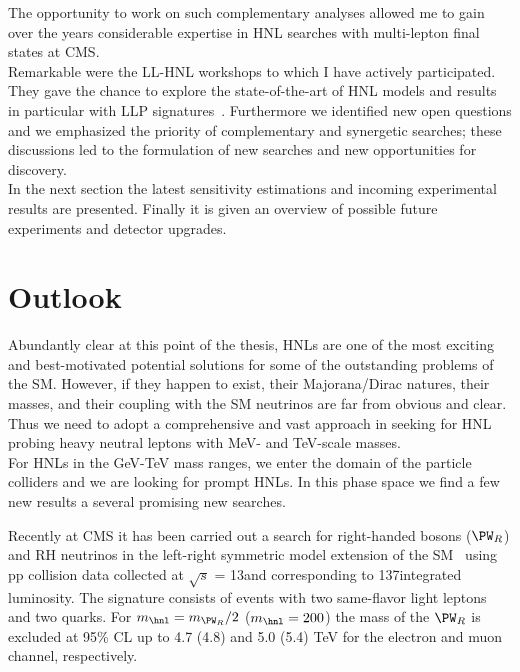 The opportunity to work on such complementary analyses
allowed me to gain over the years considerable expertise in HNL
searches with multi-lepton final states at CMS.\\
Remarkable were the LL-HNL workshops to which I have actively
participated. They gave the chance to explore the 
state-of-the-art of HNL models and results in particular with LLP
signatures~\cite{Alimena_2020}. Furthermore we identified new open questions and
we emphasized the priority 
of complementary and synergetic searches; these discussions
led to the formulation of new searches and new opportunities
for discovery.\\

In the next section the latest sensitivity
estimations and incoming experimental results are presented. Finally
it is given 
an overview of possible future experiments
and detector upgrades. 


\section{Outlook}
Abundantly clear at this point of the thesis, HNLs are one of the most
exciting and best-motivated potential solutions for some of the
outstanding problems of the SM. However, if they happen to exist, their
Majorana/Dirac natures, their masses, and their coupling with the SM
neutrinos are far from obvious and clear. Thus we need to adopt a
comprehensive and vast approach in seeking for HNL probing heavy
neutral leptons with MeV- and TeV-scale masses.\\

For HNLs in the GeV-TeV mass ranges, we enter the domain of the
particle colliders and we are looking for prompt HNLs. 
In this phase space we find a few new results a several
promising new searches.

Recently at CMS it has been carried out a search for right-handed bosons ($\PW_R$)
and RH neutrinos in the left-right symmetric model extension of the
SM~\cite{CMS-PAS-EXO-20-002} using pp collision data collected at $\sqrt{s}$ =
 13\TeV and corresponding to 137\fbinv integrated luminosity. The
 signature consists of events with two same-flavor light leptons and
 two quarks. For $m_\hnl = m_{\PW_{R}}/2$ ($m_\hnl = 200$\GeV) the
 mass of the $\PW_R$ is excluded at 95\% CL up to 4.7 (4.8) and 5.0 (5.4) TeV for the electron and muon
channel, respectively. 

